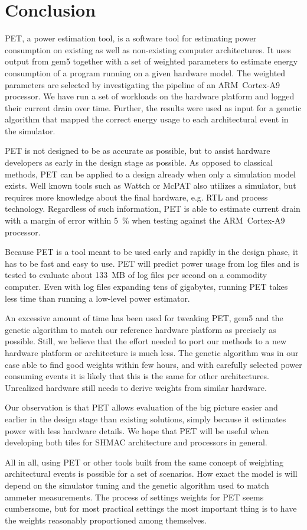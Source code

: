 \section{Conclusion}

PET, a power estimation tool, is a software tool for estimating power
consumption on existing as well as non-existing computer architectures. It uses
output from gem5 together with a set of weighted parameters to estimate energy
consumption of a program running on a given hardware model. The weighted
parameters are selected by investigating the pipeline of an ARM~Cortex-A9
processor. We have run a set of workloads on the hardware platform and logged
their current drain over time. Further, the results were used as input for a
genetic algorithm that mapped the correct energy usage to each architectural
event in the simulator.

PET is not designed to be as accurate as possible, but to assist hardware
developers as early in the design stage as possible. As opposed to classical
methods, PET can be applied to a design already when only a simulation model
exists. Well known tools such as Wattch \cite{brooks2000wattch} or McPAT
\cite{li2009mcpat,li2013mcpat} also utilizes a simulator, but requires more knowledge about
the final hardware, e.g. RTL and process technology. Regardless of such
information, PET is able to estimate current drain with a margin of error within
5~\% when testing against the ARM~Cortex-A9 processor.

Because PET is a tool meant to be used early and rapidly in the design phase, it
has to be fast and easy to use. PET will predict power usage from log files and
is tested to evaluate about 133~MB of log files per second on a commodity
computer. Even with log files expanding tens of gigabytes, running PET takes
less time than running a low-level power estimator.

An excessive amount of time has been used for tweaking PET, gem5 and the genetic
algorithm to match our reference hardware platform as precisely as possible. Still,
we believe that the effort needed to port our methods to a new hardware platform
or architecture is much less. The genetic algorithm was in our case able to find
good weights within few hours, and with carefully selected power consuming
events it is likely that this is the same for other architectures. Unrealized
hardware still needs to derive weights from similar hardware.

Our observation is that PET allows evaluation of the big picture easier and
earlier in the design stage than existing solutions, simply because it
estimates power with less hardware details. We hope that PET will be useful
when developing both tiles for SHMAC architecture and processors in general.

All in all, using PET or other tools built from the same concept of weighting
architectural events is possible for a set of scenarios. How exact the model is
will depend on the simulator tuning and the genetic algorithm used to match
ammeter measurements. The process of settings weights for PET seems cumbersome,
but for most practical settings the most important thing is to have the weights
reasonably proportioned among themselves.

